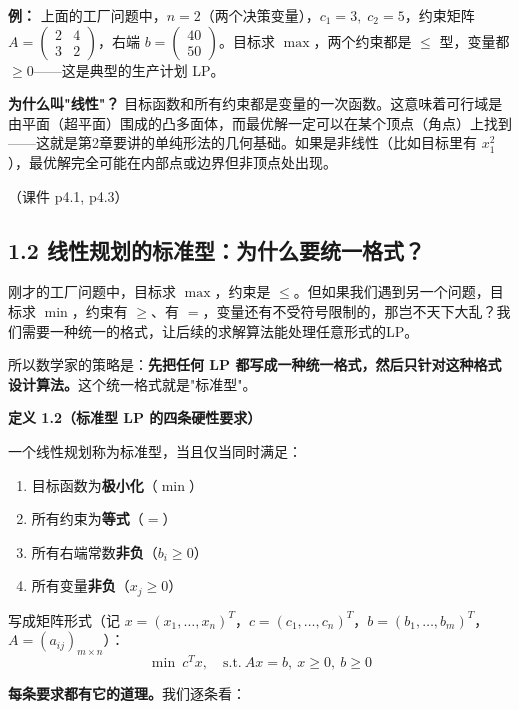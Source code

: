 \textbf{例：} 上面的工厂问题中，$n=2$（两个决策变量），$c_1=3,\;c_2=5$，约束矩阵 $A=\begin{pmatrix}2 & 4 \\ 3 & 2\end{pmatrix}$，右端 $b=\begin{pmatrix}40 \\ 50\end{pmatrix}$。目标求 $\max$，两个约束都是 $\le$ 型，变量都 $\ge 0$——这是典型的生产计划 LP。

\textbf{为什么叫"线性"？} 目标函数和所有约束都是变量的一次函数。这意味着可行域是由平面（超平面）围成的凸多面体，而最优解一定可以在某个顶点（角点）上找到——这就是第2章要讲的单纯形法的几何基础。如果是非线性（比如目标里有 $x_1^2$），最优解完全可能在内部点或边界但非顶点处出现。

（课件 p4.1, p4.3）

\subsection{1.2 线性规划的标准型：为什么要统一格式？}

刚才的工厂问题中，目标求 $\max$，约束是 $\le$。但如果我们遇到另一个问题，目标求 $\min$，约束有 $\ge$、有 $=$，变量还有不受符号限制的，那岂不天下大乱？我们需要一种统一的格式，让后续的求解算法能处理任意形式的LP。

所以数学家的策略是：\textbf{先把任何 LP 都写成一种统一格式，然后只针对这种格式设计算法。}这个统一格式就是"标准型"。

\textbf{定义 1.2（标准型 LP 的四条硬性要求）}

一个线性规划称为标准型，当且仅当同时满足：
\begin{enumerate}
  \item[(1)] 目标函数为\textbf{极小化}（$\min$）
  \item[(2)] 所有约束为\textbf{等式}（$=$）
  \item[(3)] 所有右端常数\textbf{非负}（$b_i \ge 0$）
  \item[(4)] 所有变量\textbf{非负}（$x_j \ge 0$）
\end{enumerate}

写成矩阵形式（记 $x=(x_1,\dots,x_n)^T$，$c=(c_1,\dots,c_n)^T$，$b=(b_1,\dots,b_m)^T$，$A=(a_{ij})_{m\times n}$）：
\[
\min\ c^T x,\quad \text{s.t.}\ Ax = b,\ x \ge 0,\ b \ge 0
\]

\textbf{每条要求都有它的道理。}我们逐条看：

